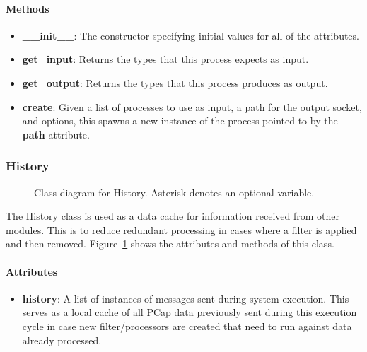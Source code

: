 \documentclass[titlepage]{article}
\newcommand{\umlclass}[5][,]{
    \node [umlclass,#1] (#2) {
        \textbf{#3}
        \nodepart{second}
        \begin{description*}
        #4
        \end{description*}
        \nodepart{third}
        \begin{description*}
        #5
        \end{description*}
    };
}
\newcommand{\umlattr}[3]{
    \item[$#1$]\textbf{#2}: \textit{#3}
}
\newcommand{\umlmethod}[4]{
    \item[$#1$]\textbf{#2}({#3}): \textit{#4}
}
\begin{document}
\paragraph{Methods}
\begin{itemize}
    \item \textbf{\_\_init\_\_}: The constructor specifying initial values for
        all of the attributes.
    \item \textbf{get\_input}: Returns the types that this process expects as input.
    \item \textbf{get\_output}: Returns the types that this process produces as output.
    \item \textbf{create}: Given a list of processes to use as input, a path
        for the output socket, and options, this spawns a new instance of the
        process pointed to by the \textbf{path} attribute.
\end{itemize}


\subsubsection{History
    \label{class-history}
}

\begin{figure}
    \centering
    \caption{Class diagram for History.  Asterisk denotes an optional variable.}
    \label{fig-kernel_history}
\end{figure}

The History class is used as a data cache for information received from other
modules.  This is to reduce redundant processing in cases where a filter is
applied and then removed.  Figure~\ref{fig-kernel_history} shows the attributes
and methods of this class.

\paragraph{Attributes}
\begin{itemize}
    \item \textbf{history}: A list of  instances
        of messages sent during system execution.  This serves as a local cache
        of all PCap data previously sent during this execution cycle in case
        new filter/processors are created that need to run against data already
        processed.
\end{itemize}
\end{document}
